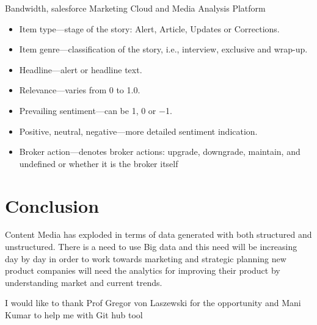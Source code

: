 \documentclass[sigconf]{acmart}
\begin{document}
Bandwidth, salesforce Marketing Cloud and Media Analysis Platform 
\begin{itemize}
\item Item type—stage of the story: Alert, Article, Updates or Corrections.
\item Item genre—classification of the story, i.e., interview, exclusive and wrap-up.
\item Headline—alert or headline text.
\item Relevance—varies from 0 to 1.0.
\item Prevailing sentiment—can be 1, 0 or −1.
\item Positive, neutral, negative—more detailed sentiment indication.
\item Broker action—denotes broker actions: upgrade, downgrade, maintain, and undefined or whether it is the broker itself
\end{itemize}

\section{Conclusion}

Content Media has exploded in terms of data generated with both structured and unstructured.
There is a need to use Big data and this need will be increasing day by day in order to work towards marketing and strategic planning new product companies will need the analytics for improving their product by understanding market and current trends.

\begin{acks}

  I would like to thank Prof  Gregor von Laszewski for the opportunity and Mani Kumar to help me with Git hub tool

\end{acks}


 


\end{document}
